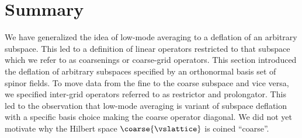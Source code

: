 \section{Summary}
\label{sec:sd:summary}

We have generalized the idea of low-mode averaging to a deflation of an arbitrary subspace.
This led to a definition of linear operators restricted to that subspace which we refer to as coarsenings or coarse-grid operators.
This section introduced the deflation of arbitrary subspaces specified by an orthonormal basis set of spinor fields.
To move data from the fine to the coarse subspace and vice versa, we specified inter-grid operators referred to as restrictor and prolongator.
This led to the observation that low-mode averaging is variant of subspace deflation with a specific basis choice making the coarse operator diagonal.
We did not yet motivate why the Hilbert space $\coarse{\vslattice}$ is coined ``coarse''.
